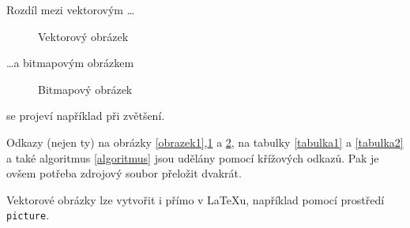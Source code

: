 \documentclass[11pt,a4paper]{article}
\begin{document}
Rozdíl mezi vektorovým \dots
\begin{figure}[h]
  \begin{center}
    \caption{Vektorový obrázek}
    \label{obrazek2}
  \end{center}
\end{figure}
\dots a bitmapovým obrázkem
\begin{figure}[h]
  \begin{center}
    \caption{Bitmapový obrázek}
    \label{obrazek3}
  \end{center}
\end{figure}
se projeví například při zvětšení.

Odkazy (nejen ty) na obrázky \ref{obrazek1},\ref{obrazek2} a \ref{obrazek3}, na tabulky \ref{tabulka1} a \ref{tabulka2} a také algoritmus \ref{algoritmus} jsou udělány pomocí křížových odkazů. Pak je ovšem potřeba zdrojový soubor přeložit dvakrát.

Vektorové obrázky lze vytvořit i přímo v {\LaTeX}u, například pomocí prostředí \texttt{picture}.
\end{document}
